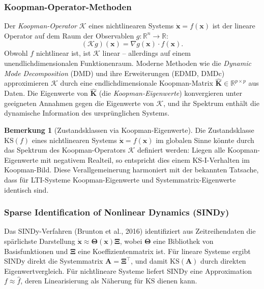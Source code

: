 \documentclass[a4paper, 12pt, twoside, openright]{report}
\theoremstyle{definition}
\newtheorem{remark}[theorem]{Bemerkung}
\theoremstyle{definition}
\newcommand{\R}{\mathbb{R}}
\newcommand{\vx}{\bm{x}}
\newcommand{\vA}{\bm{A}}
\newcommand{\vK}{\bm{K}}
\newcommand{\T}{\top}
\newcommand{\KS}{\mathrm{KS}}
\begin{document}
\subsubsection*{Koopman-Operator-Methoden}

Der \emph{Koopman-Operator} $\mathcal{K}$ eines nichtlinearen Systems
$\dot{\vx} = f(\vx)$ ist der lineare Operator auf dem Raum der Observablen
$g : \R^n \to \R$:
\begin{equation}
  (\mathcal{K} g)(\vx) = \nabla g(\vx) \cdot f(\vx).
  \label{eq:koopman}
\end{equation}
Obwohl $f$ nichtlinear ist, ist $\mathcal{K}$ linear -- allerdings auf einem
unendlichdimensionalen Funktionenraum. Moderne Methoden wie die \emph{Dynamic Mode
Decomposition} (DMD) und ihre Erweiterungen (EDMD, DMDc) approximieren $\mathcal{K}$
durch eine endlichdimensionale Koopman-Matrix $\hat{\vK} \in \R^{p \times p}$
aus Daten. Die Eigenwerte von $\hat{\vK}$ (die \emph{Koopman-Eigenwerte}) konvergieren
unter geeigneten Annahmen gegen die Eigenwerte von $\mathcal{K}$, und ihr Spektrum
enthält die dynamische Information des ursprünglichen Systems.

\begin{remark}[Zustandsklassen via Koopman-Eigenwerte]
Die Zustandsklasse $\KS(f)$ eines nichtlinearen Systems $\dot{\vx} = f(\vx)$ im globalen
Sinne könnte durch das Spektrum des Koopman-Operators $\mathcal{K}$ definiert werden:
Liegen alle Koopman-Eigenwerte mit negativem Realteil, so entspricht dies einem
KS-I-Verhalten im Koopman-Bild. Diese Verallgemeinerung harmoniert mit der
bekannten Tatsache, dass für LTI-Systeme Koopman-Eigenwerte und Systemmatrix-Eigenwerte
identisch sind.
\end{remark}

\subsubsection*{Sparse Identification of Nonlinear Dynamics (SINDy)}

Das SINDy-Verfahren (Brunton et al., 2016) identifiziert aus Zeitreihendaten die
spärlichste Darstellung $\dot{\vx} \approx \bm{\Theta}(\vx)\bm{\Xi}$, wobei
$\bm{\Theta}$ eine Bibliothek von Basisfunktionen und $\bm{\Xi}$ eine Koeffizientenmatrix
ist. Für lineare Systeme ergibt SINDy direkt die Systemmatrix $\vA = \bm{\Xi}^\T$,
und damit $\KS(\vA)$ durch direkten Eigenwertvergleich. Für nichtlineare Systeme
liefert SINDy eine Approximation $f \approx \hat{f}$, deren Linearisierung als
Näherung für $\KS$ dienen kann.
\end{document}
